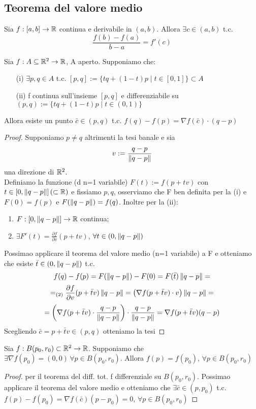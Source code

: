 \subsection{Teorema del valore medio}
\begin{theorem}[TdVM, n=1]
  Sia $f:[a,b]\to \mathbb{R}$ continua e derivabile in $(a,b)$. Allora $\exists c \in (a,b)$ t.c.
  $$\frac{f(b)-f(a)}{b-a} = f'(c)$$
\end{theorem}
\begin{theorem}[del valore medio, n=2]
  Sia $f: A \subseteq \mathbb{R}^2 \to \mathbb{R}$, A aperto. Supponiamo che:
  \begin{enumerate}
    \item[(i)] $\exists p,q \in A$ t.c. $[p,q] := \{tq+(1-t)p \mid t\in [0,1]\} \subset A$
    \item[(ii)] f \ace continua sull'insieme $[p,q]$ e differenziabile su $(p,q) := \{tq+(1-t)p \mid t \in (0,1)\}$ 
  \end{enumerate}
  Allora esiste un punto $\bar{c} \in (p,q)$ t.c. $f(q)-f(p) = \nabla f(\bar{c})\cdot (q-p)$
  \begin{proof}
    Supponiamo $p \not = q$ altrimenti la tesi \ace banale e sia 
    $$v := \frac{q-p}{\left\lVert q-p\right\rVert}$$ una direzione di $\mathbb{R}^2$. \\
    Definiamo la funzione (d n=1 variabile) $F(t) := f(p+tv)$ con $t\in \left[0,\left\lVert q-p\right\rVert\right] (\subset \mathbb{R})$ e fissiamo $p,q$, 
    osserviamo che F \ace ben definita per la (i) e $F(0) = f(p)$ e $F(\left\lVert q-p\right\rVert) = f(q)$.
    Inoltre per la (ii):
    \begin{enumerate}
      \item $F:[0,\left\lVert q-p\right\rVert] \to \mathbb{R}$ \ace continua;
      \item $\exists F'(t) = \frac{\partial f}{\partial v} (p+tv)$, $\forall t \in (0,\left\lVert q-p\right\rVert)$
    \end{enumerate}
    Possimao applicare il teorema del valore medio (n=1 variabile) a F e otteniamo che esiste 
    $\bar{t} \in (0,\left\lVert q-p\right\rVert)$ t.c. 
    $$f(q)-f(p) = F(\left\lVert q-p\right\rVert) - F(0) = F(\bar{t})\left\lVert q-p\right\rVert = $$
    $$=_{(2)} \frac{\partial f}{\partial v}(p+\bar{t}v)\left\lVert q-p\right\rVert = \left(\nabla f(p+\bar{t}v)\cdot v\right)\left\lVert q-p\right\rVert = $$
    $$= \left(\nabla f(p+\bar{t}v)\cdot \frac{q-p}{\left\lVert q-p\right\rVert}\right)\cdot \frac{q-p}{\left\lVert q-p\right\rVert} = \nabla f(p+\bar{t}v)(q-p)$$
    Scegliendo $\bar{c} = p+\bar{t}v \in (p,q)$ otteniamo la tesi  
  \end{proof}
\end{theorem}
\begin{corollary}
  Sia $f: B(p_0,r_0) \subset \mathbb{R}^2 \to \mathbb{R}$. Supponiamo che $\exists \nabla f(p_0) = (0,0) \, \forall p \in B(p_0,r_0)$.
  Allora $f(p) = f(p_0)$, $\forall p \in B(p_0,r_0)$
  \begin{proof}
    per il teorema del diff. tot. f \ace differenziale su $B(p_0,r_0)$. Possimao applicare il teorema del valore 
    medio e otteniamo che $\exists \bar{c} \in (p,p_0)$ t.c. $f(p)-f(p_0) = \nabla f(\bar{c}) (p-p_0) = 0$, $\forall p \in B(p_0,r_0)$
  \end{proof}
\end{corollary}